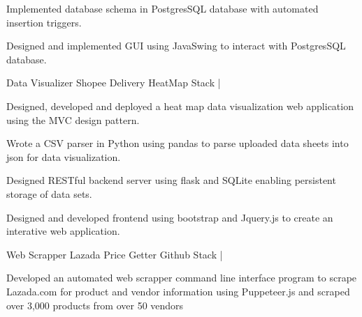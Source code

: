 \begin{cventries}
{\begin{cvitems}
        \item{Implemented database schema in PostgresSQL database with automated insertion triggers. }
        \item{Designed and implemented GUI using JavaSwing to interact with PostgresSQL database. }
        \end{cvitems}
    }
    \cventry
    {Data Visualizer} %
    {Shopee Delivery HeatMap} %
    {\href{https://github.com/giathuan123/HeatMap}{\faGithubSquare}} %
    {Stack | \diExpressOriginal \diNodejsPlain \diBootstrapPlain \diJqueryPlain \diPythonPlain } %
    {
        \begin{cvitems} %
          \item{Designed, developed and deployed a heat map data visualization web application using the MVC design pattern. }
          \item{Wrote a CSV parser in Python using pandas to parse uploaded data sheets into json for data visualization. }
          \item{Designed RESTful backend server using flask and SQLite enabling persistent storage of data sets. }
          \item{Designed and developed frontend using bootstrap and Jquery.js to create an interative web application. }
        \end{cvitems}
    }
    \cventry
    {Web Scrapper} %
    {Lazada Price Getter} %
    {Github} %
    {Stack | \diNodejsPlain \space \space  } %
    {
        \begin{cvitems} %
        \item{Developed an automated web scrapper command line interface program to scrape Lazada.com for product and vendor information using Puppeteer.js and scraped over 3,000 products from over 50 vendors }
        \end{cvitems}
    }
\end{cventries}
